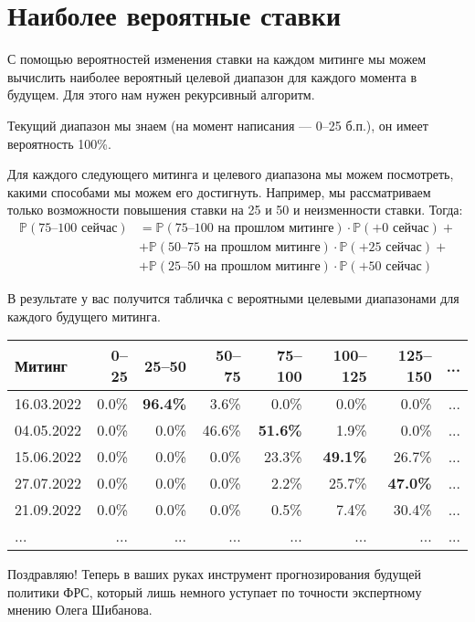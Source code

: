 \documentclass[a4paper,14pt]{extarticle}
\begin{document}
\section*{Наиболее вероятные ставки}

С помощью вероятностей изменения ставки на каждом митинге мы можем вычислить наиболее 
вероятный целевой диапазон для каждого момента в будущем. Для этого нам нужен рекурсивный 
алгоритм.

Текущий диапазон мы знаем (на момент написания --- 0--25 б.п.), он имеет вероятность 100\%.

Для каждого следующего митинга и целевого диапазона мы можем посмотреть, какими 
способами мы можем его достигнуть. Например, мы рассматриваем только возможности 
повышения ставки на 25 и 50 и неизменности ставки. Тогда:
\begin{align*}
\mathbb{P}(\text{75--100 сейчас}) &=
\mathbb{P}(\text{75--100 на прошлом митинге}) \cdot \mathbb{P}(\text{+0 сейчас}) + \\
&+ \mathbb{P}(\text{50--75 на прошлом митинге}) \cdot \mathbb{P}(\text{+25 сейчас}) + \\
&+ \mathbb{P}(\text{25--50 на прошлом митинге}) \cdot \mathbb{P}(\text{+50 сейчас})
\end{align*}

В результате у вас получится табличка с вероятными целевыми диапазонами для каждого
будущего митинга.

\begin{table}[h]
\centering
\begin{tabular}{l|r|r|r|r|r|r|r}
Митинг     &  0--25 & 25--50 & 50--75 & 75--100 & 100--125 & 125--150 & ... \\ \hline
16.03.2022 &	 0.0\%	 & \textbf{96.4\%} &  3.6\% &   0.0\% &	   0.0\% &    0.0\% & ... \\ 
04.05.2022 &	 0.0\%	 &  0.0\% & 46.6\% &  \textbf{51.6\%} &	   1.9\% &    0.0\% & ... \\
15.06.2022 &	 0.0\%	 &  0.0\% &  0.0\% &  23.3\%	 &   \textbf{49.1\%} &   26.7\%  & ... \\
27.07.2022 &	 0.0\%	 &  0.0\% &  0.0\% &   2.2\%	 &   25.7\% &   \textbf{47.0\%}  & ...\\
21.09.2022 &	 0.0\%	 &  0.0\% &  0.0\% &   0.5\%	 &    7.4\% &   30.4\% & ... \\
...        & ...    & ...    &  ...   &   ...   &    ...   &    ...   & ... 
\end{tabular}
\end{table}

Поздравляю! Теперь в ваших руках инструмент прогнозирования будущей политики ФРС, 
который лишь немного уступает по точности экспертному мнению Олега Шибанова.
\end{document}

